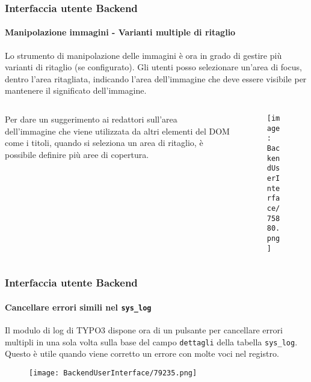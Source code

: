 \begin{frame}[fragile]
	\frametitle{Interfaccia utente Backend}
	\framesubtitle{Manipolazione immagini - Varianti multiple di ritaglio}

	Lo strumento di manipolazione delle immagini è ora in grado di gestire più varianti di ritaglio (se configurato).
	Gli utenti posso selezionare un'area di focus, dentro l'area ritagliata, indicando l'area dell'immagine che
	deve essere visibile per mantenere il significato dell'immagine.
	
	\begin{columns}[T]
		\begin{column}{.4\textwidth}
			Per dare un suggerimento ai redattori sull'area dell'immagine che viene utilizzata da altri elementi 
			del DOM come i titoli, quando si seleziona un area di ritaglio, è possibile definire più aree di copertura.
		\end{column}

		\begin{column}{.6\textwidth}
			\begin{figure}\vspace*{-0.6cm}
				\texttt{[image: BackendUserInterface/75880.png]}
			\end{figure}
		\end{column}
	\end{columns}

\end{frame}

\begin{frame}[fragile]
	\frametitle{Interfaccia utente Backend}
	\framesubtitle{Cancellare errori simili nel \texttt{sys\_log}}
	
	Il modulo di log di TYPO3 dispone ora di un pulsante per cancellare errori multipli in una sola volta
	sulla base del campo \texttt{dettagli} della tabella \texttt{sys\_log}. Questo è utile quando
	viene corretto un errore con molte voci nel registro.

	\begin{figure}\vspace{-0.2cm}
		\texttt{[image: BackendUserInterface/79235.png]}
	\end{figure}

\end{frame}

